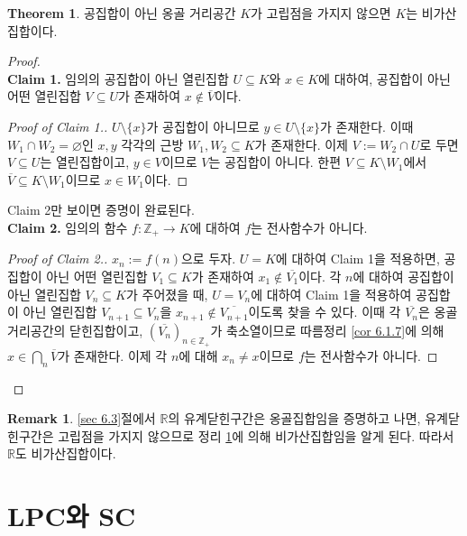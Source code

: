 \documentclass[11pt]{book}
\numberwithin{equation}{chapter}
\def\ZZ{\mathbb{Z}}
\def\RR{\mathbb{R}}
\theoremstyle{definition}
\newtheorem{thm}{Theorem}[section]
\newtheorem*{rem}{Remark}
\begin{document}
\begin{thm} \label{thm 6.1.8}
    공집합이 아닌 옹골 거리공간 \(K\)가 고립점을 가지지 않으면 \(K\)는 비가산집합이다.
\end{thm}
\begin{proof}
    \quad\\
    \textbf{Claim 1.} 임의의 공집합이 아닌 열린집합 \(U \subseteq K\)와 \(x \in K\)에 대하여, 공집합이 아닌 어떤 열린집합 \(V \subseteq U\)가 존재하여 \(x \notin \overline{V}\)이다.
    \begin{proof}[Proof of Claim 1.]
        \(U \setminus \{x\}\)가 공집합이 아니므로 \(y \in U \setminus \{x\}\)가 존재한다. 이때 \(W_1 \cap W_2 = \varnothing\)인 \(x, y\) 각각의 근방 \(W_1, W_2 \subseteq K\)가 존재한다. 이제 \(V := W_2 \cap U\)로 두면 \(V \subseteq U\)는 열린집합이고, \(y \in V\)이므로 \(V\)는 공집합이 아니다. 한편 \(V \subseteq K \setminus W_1\)에서 \(\overline{V} \subseteq K \setminus W_1\)이므로 \(x \in W_1\)이다.
    \end{proof}
     Claim 2만 보이면 증명이 완료된다.\\
    \textbf{Claim 2.} 임의의 함수 \(f : \ZZ_+ \to K\)에 대하여 \(f\)는 전사함수가 아니다.
    \begin{proof}[Proof of Claim 2.]
        \(x_n := f(n)\)으로 두자. \(U = K\)에 대하여 Claim 1을 적용하면, 공집합이 아닌 어떤 열린집합 \(V_1 \subseteq K\)가 존재하여 \(x_1 \notin \overline{V_1}\)이다. 각 \(n\)에 대하여 공집합이 아닌 열린집합 \(V_n \subseteq K\)가 주어졌을 때, \(U = V_{n}\)에 대하여 Claim 1을 적용하여 공집합이 아닌 열린집합 \(V_{n+1} \subseteq V_n\)을 \(x_{n+1} \notin \overline{V_{n+1}}\)이도록 찾을 수 있다. 이때 각 \(\overline{V_n}\)은 옹골 거리공간의 닫힌집합이고, \((\overline{V_n})_{n \in \ZZ_+}\)가 축소열이므로 따름정리 \ref{cor 6.1.7}에 의해 \(x \in \bigcap_n \overline{V}\)가 존재한다. 이제 각 \(n\)에 대해 \(x_{n} \ne x\)이므로 \(f\)는 전사함수가 아니다.
    \end{proof}
\end{proof}

\begin{rem}
    \ref{sec 6.3}절에서 \(\RR\)의 유계닫힌구간은 옹골집합임을 증명하고 나면, 유계닫힌구간은 고립점을 가지지 않으므로 정리 \ref{thm 6.1.8}에 의해 비가산집합임을 알게 된다. 따라서 \(\RR\)도 비가산집합이다.
\end{rem}

\section{LPC와 SC}
\end{document}
